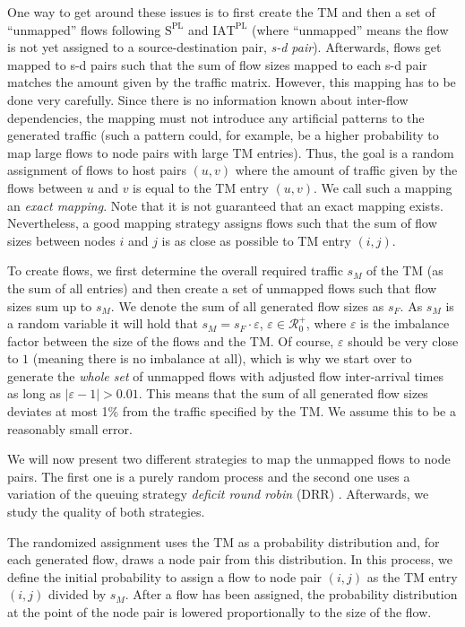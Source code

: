 \documentclass[journal,10pt]{IEEEtran}
\newcommand{\iat}[1] {\ensuremath{\mathrm{IAT}^{\mathrm{#1}}}}
\newcommand{\size}[1]{\ensuremath{\mathrm{S}  ^{\mathrm{#1}}}}
\begin{document}
One way to get around these issues is to first create the TM and then a set of ``unmapped'' flows following \size{PL} and \iat{PL} 
(where ``unmapped'' means the flow is not yet assigned to a source-destination pair, \emph{s-d pair}).
Afterwards, flows get mapped to s-d pairs such that the sum of flow sizes mapped to each s-d pair matches
the amount given by the traffic matrix.
However, this mapping has to be done very carefully. 
Since there is no information known about inter-flow dependencies,
the mapping must not introduce any artificial patterns to the generated traffic 
(such a pattern could, for example, be a higher probability to map large flows to node pairs with large TM entries).
Thus, the goal is a random assignment of flows to host pairs $(u,v)$ where the amount of traffic given by the flows between $u$ and $v$ is equal 
to the TM entry $(u,v)$.
We call such a mapping an \emph{exact mapping}.
Note that it is not guaranteed that an exact mapping exists.
Nevertheless, a good mapping strategy assigns flows such that the sum of flow sizes between nodes $i$ and $j$ is as close as possible to TM entry $(i,j)$.

To create flows, we first determine the overall required traffic $s_{M}$ of the TM (as the sum of all entries) 
and then create a set of unmapped flows such that flow sizes sum up to $s_{M}$. We denote the sum of all generated flow sizes as $s_{F}$.
As $s_M$ is a random variable it will hold that $s_{M} = s_{F} \cdot \varepsilon$, $\varepsilon \in \mathcal{R}^+_0$,
where $\varepsilon$ is the imbalance factor between the size of the flows and the TM.
Of course, $\varepsilon$ should be very close to $1$ (meaning there is no imbalance at all), which is why we start over to generate
the \emph{whole set} of unmapped flows with adjusted flow inter-arrival times as long as
$\mid \varepsilon - 1 \mid > 0.01$. This means that the sum of all generated flow sizes deviates at most 1\% from the traffic specified by the TM.
We assume this to be a reasonably small error.


We will now present two different strategies to map the unmapped flows to node pairs. The first one is a purely random process and the second one uses a variation of the queuing strategy
\emph{deficit round robin} (DRR) \cite{shreedhar1995efficient}. Afterwards, we study the quality of both strategies.

The randomized assignment uses the TM as a probability distribution and, for each generated flow, draws a node pair from this distribution.
In this process, we define the initial probability to assign a flow to node pair $(i,j)$ as the TM entry $(i,j)$ divided by $s_{M}$.
After a flow has been assigned, the probability distribution at the point of the node pair is lowered proportionally to the size of the flow.
\end{document}

